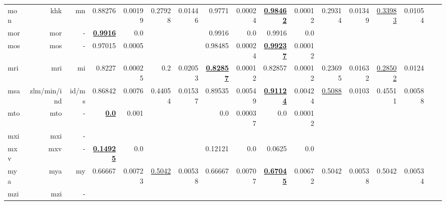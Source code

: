 \documentclass[11pt]{article}
\begin{document}
\begin{table*}[h]
{\begin{tabular}{lrrrrrrrrrrrrrrrr}
mon         & khk         & mn         & 0.88276         & 0.00199         & 0.27928         & 0.01446         & 0.9771         & 0.00024         & \textbf{\underline{0.98462}}         & 0.00012         & 0.29314         & 0.01349         & \underline{0.33983}         & 0.01054         \\
mor         & mor         & -         & \textbf{\underline{0.9916}}         & 0.0         &          &          & 0.9916         & 0.0         & 0.9916         & 0.0         &          &          &          &          \\
mos         & mos         & -         & 0.97015         & 0.0005         &          &          & 0.98485         & 0.00024         & \textbf{\underline{0.99237}}         & 0.00012         &          &          &          &          \\
mri         & mri         & mi         & 0.8227         & 0.00025         & 0.2         & 0.02053         & \textbf{\underline{0.82857}}         & 0.00012         & 0.82857         & 0.00012         & 0.23695         & 0.01632         & \underline{0.28502}         & 0.0124         \\
msa         & zlm/min/ind         & id/ms         & 0.86842         & 0.0076         & 0.44054         & 0.01537         & 0.89535         & 0.00549         & \textbf{\underline{0.91124}}         & 0.00424         & \underline{0.5088}         & 0.0103         & 0.45511         & 0.00588         \\
mto         & mto         & -         & \textbf{\underline{0.0}}         & 0.001         &          &          & 0.0         & 0.00037         & 0.0         & 0.00012         &          &          &          &          \\
mxi         & mxi         & -         &          &          &          &          &          &          &          &          &          &          &          &          \\
mxv         & mxv         & -         & \textbf{\underline{0.14925}}         & 0.0         &          &          & 0.12121         & 0.0         & 0.0625         & 0.0         &          &          &          &          \\
mya         & mya         & my         & 0.66667         & 0.00723         & \underline{0.5042}         & 0.00538         & 0.66667         & 0.00707         & \textbf{\underline{0.67045}}         & 0.00672         & 0.5042         & 0.00538         & 0.5042         & 0.00534         \\
mzi         & mzi         & -         &          &          &          &          &          &          &          &          &          &          &          &          \\

\end{tabular}}
\end{table*}
\end{document}

